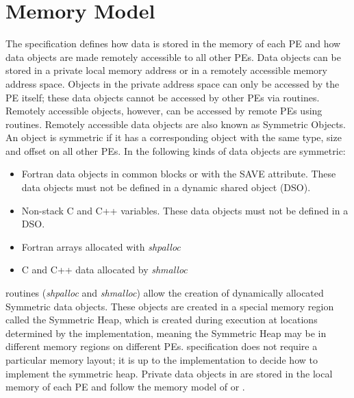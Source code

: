 \section{Memory Model}

The \openshmem specification defines how data is stored in the memory
of each \ac{PE} and how data objects are made remotely accessible to all
other \ac{PE}s. Data objects can be stored in a private local memory address or in
a remotely accessible memory address space. Objects in the private
address space can only be accessed by the \ac{PE} itself; these data objects
cannot be accessed by other \ac{PE}s via \openshmem routines. Remotely accessible
objects, however, can be accessed by remote \ac{PE}s using \openshmem routines.
Remotely accessible data objects are also known as Symmetric Objects.
An object is symmetric if it has a corresponding object with the same
type, size and offset on all other \ac{PE}s. 
In \openshmem{} the following kinds of data objects are symmetric:
\begin{itemize}
  \item Fortran data objects in common blocks or with the  SAVE  attribute. These data objects	must not be defined in a dynamic shared object (DSO).
  \item Non-stack C and C++ variables.   These  data	objects must  not  be defined in a DSO.
  \item Fortran arrays allocated with \textit{shpalloc} 
  \item C and C++ data allocated by \textit{shmalloc}
\end{itemize}       


\openshmem routines (\textit{shpalloc} and \textit{shmalloc}) allow the creation of dynamically allocated Symmetric
data objects. These objects are created in a special memory region
called the Symmetric Heap, which is created during execution at locations
determined by the implementation, meaning the Symmetric Heap may be
in different memory regions on different \ac{PE}s. \openshmem specification does not require a particular memory layout; it is up to the implementation
to decide how to implement the symmetric heap. Private data objects in \openshmem are stored in the local memory of each \ac{PE} 
and follow the memory model of \Clang{} or \Fortran{}. 



%

